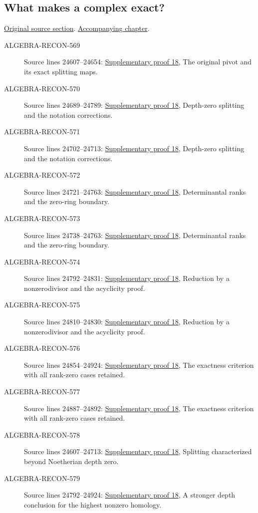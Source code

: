 \subsection{What makes a complex exact?}
\hypertarget{algebra-source-section-complex-exact}{}
\noindent\href{https://github.com/stacks/stacks-project/blob/a04446e57ec1fbc252a871afcec7752fb2807b14/algebra.tex\#L24576}{Original source section}. \href{algebra.pdf\#nameddest=section-complex-exact}{Accompanying chapter}.

\begin{description}
\item[ALGEBRA-RECON-569] Source lines 24607--24654: \hyperlink{algebra_complex_exactness_notes_20260928}{Supplementary proof 18}, The original pivot and its exact splitting maps.
\item[ALGEBRA-RECON-570] Source lines 24689--24789: \hyperlink{algebra_complex_exactness_notes_20260928}{Supplementary proof 18}, Depth-zero splitting and the notation corrections.
\item[ALGEBRA-RECON-571] Source lines 24702--24713: \hyperlink{algebra_complex_exactness_notes_20260928}{Supplementary proof 18}, Depth-zero splitting and the notation corrections.
\item[ALGEBRA-RECON-572] Source lines 24721--24763: \hyperlink{algebra_complex_exactness_notes_20260928}{Supplementary proof 18}, Determinantal ranks and the zero-ring boundary.
\item[ALGEBRA-RECON-573] Source lines 24738--24763: \hyperlink{algebra_complex_exactness_notes_20260928}{Supplementary proof 18}, Determinantal ranks and the zero-ring boundary.
\item[ALGEBRA-RECON-574] Source lines 24792--24831: \hyperlink{algebra_complex_exactness_notes_20260928}{Supplementary proof 18}, Reduction by a nonzerodivisor and the acyclicity proof.
\item[ALGEBRA-RECON-575] Source lines 24810--24830: \hyperlink{algebra_complex_exactness_notes_20260928}{Supplementary proof 18}, Reduction by a nonzerodivisor and the acyclicity proof.
\item[ALGEBRA-RECON-576] Source lines 24854--24924: \hyperlink{algebra_complex_exactness_notes_20260928}{Supplementary proof 18}, The exactness criterion with all rank-zero cases retained.
\item[ALGEBRA-RECON-577] Source lines 24887--24892: \hyperlink{algebra_complex_exactness_notes_20260928}{Supplementary proof 18}, The exactness criterion with all rank-zero cases retained.
\item[ALGEBRA-RECON-578] Source lines 24607--24713: \hyperlink{algebra_complex_exactness_notes_20260928}{Supplementary proof 18}, Splitting characterized beyond Noetherian depth zero.
\item[ALGEBRA-RECON-579] Source lines 24792--24924: \hyperlink{algebra_complex_exactness_notes_20260928}{Supplementary proof 18}, A stronger depth conclusion for the highest nonzero homology.
\end{description}

